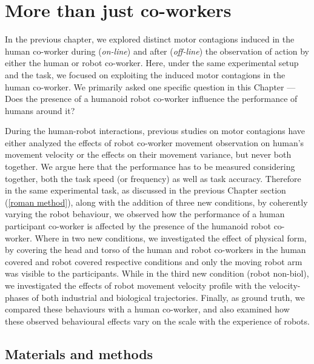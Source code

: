 
{\color{blue}\chapter{More than just co-workers}\label{more than just co-workers}}

In the previous chapter, we explored distinct motor contagions induced in the human co-worker during (\textit{on-line}) and after (\textit{off-line}) the observation of action by either the human or robot co-worker. Here, under the same experimental setup and the task, we focused on exploiting the induced motor contagions in the human co-worker. We primarily asked one specific question in this Chapter ---Does the presence of a humanoid robot co-worker influence the performance of humans around it? 

During the human-robot interactions, previous studies on motor contagions have either analyzed the effects of robot co-worker movement observation on human's movement velocity or the effects on their movement variance, but never both together. We argue here that the performance has to be measured considering together, both the task speed (or frequency) as well as task accuracy. Therefore in the same experimental task, as discussed in the previous Chapter section (\ref{roman method}), along with the addition of three new conditions, by coherently varying the robot behaviour, we observed how the performance of a human participant co-worker is affected by the presence of the humanoid robot co-worker. Where in two new conditions, we investigated the effect of physical form, by covering the head and torso of the human and robot co-workers in the human covered and robot covered respective conditions and only the moving robot arm was visible to the participants. While in the third new condition (robot non-biol), we investigated the effects of robot movement velocity profile with the velocity-phases of both industrial and biological trajectories. Finally, as ground truth, we compared these behaviours with a human co-worker, and also examined how these observed behavioural effects vary on the scale with the experience of robots.


\section{Materials and methods} \label{methods}

